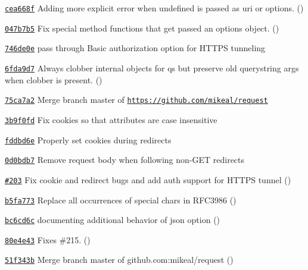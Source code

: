 \begin{DoxyItemize}
\item \href{https://github.com/mikeal/request/commit/cea668f6f7d444831313ccc0e0d301d25f2bd421}{\tt cea668f} Adding more explicit error when undefined is passed as uri or options. ()
\item \href{https://github.com/mikeal/request/commit/047b7b52f3b11f4c44a02aeb1c3583940ddb59c7}{\tt 047b7b5} Fix special method functions that get passed an options object. ()
\item \href{https://github.com/mikeal/request/commit/746de0ef2f564534b29eeb8f296a59bd2c3086a7}{\tt 746de0e} pass through Basic authorization option for H\+T\+T\+P\+S tunneling
\item \href{https://github.com/mikeal/request/commit/6fda9d7d75e24cc1302995e41e26a91e03fdfc9a}{\tt 6fda9d7} Always clobber internal objects for qs but preserve old querystring args when clobber is present. ()
\item \href{https://github.com/mikeal/request/commit/75ca7a25bc9c6102e87f3660a25835c7fcd70edb}{\tt 75ca7a2} Merge branch \textquotesingle{}master\textquotesingle{} of \href{https://github.com/mikeal/request}{\tt https\+://github.\+com/mikeal/request}
\item \href{https://github.com/mikeal/request/commit/3b9f0fd3da4ae74de9ec76e7c66c57a7f8641df2}{\tt 3b9f0fd} Fix cookies so that attributes are case insensitive
\item \href{https://github.com/mikeal/request/commit/fddbd6ee7d531bc4a82f629633b9d1637cb039e8}{\tt fddbd6e} Properly set cookies during redirects
\item \href{https://github.com/mikeal/request/commit/0d0bdb793f908492d4086fae8744f1e33e68d8c6}{\tt 0d0bdb7} Remove request body when following non-\/\+G\+E\+T redirects
\item \href{https://github.com/mikeal/request/pull/203}{\tt \#203} Fix cookie and redirect bugs and add auth support for H\+T\+T\+P\+S tunnel ()
\item \href{https://github.com/mikeal/request/commit/b5fa773994de1799cf53491db7f5f3ba32825b20}{\tt b5fa773} Replace all occurrences of special chars in R\+F\+C3986 ()
\item \href{https://github.com/mikeal/request/commit/bc6cd6ca6c6157bad76f0b2b23d4993f389ba977}{\tt bc6cd6c} documenting additional behavior of json option ()
\item \href{https://github.com/mikeal/request/commit/80e4e43186de1e9dcfaa1c9a921451560b91267c}{\tt 80e4e43} Fixes \#215. ()
\item \href{https://github.com/mikeal/request/commit/51f343b9adfc11ec1b2ddcfb52a57e1e13feacb2}{\tt 51f343b} Merge branch \textquotesingle{}master\textquotesingle{} of github.\+com\+:mikeal/request ()

\end{DoxyItemize}
